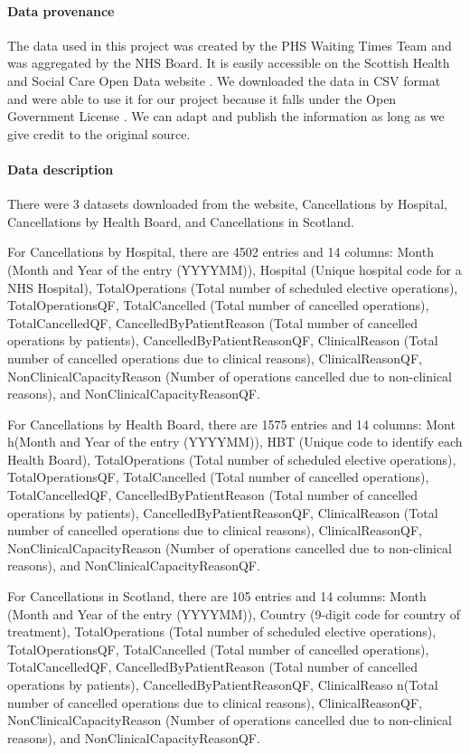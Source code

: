 \documentclass[11pt,a4paper]{article}
\begin{document}
\paragraph{Data provenance} 
The data used in this project was created by the PHS Waiting Times Team and was aggregated by the NHS Board. It is easily accessible on the Scottish Health and Social Care Open Data website \cite{public_health_scotland}. We downloaded the data in CSV format and were able to use it for our project because it falls under the Open Government License \cite{the_national_archives_2019}. We can adapt and publish the information as long as we give credit to the original source.


\paragraph{Data description} 
There were 3 datasets downloaded from the website, Cancellations by Hospital, Cancellations by Health Board, and Cancellations in Scotland. 

For Cancellations by Hospital, there are 4502 entries and 14 columns: Month (Month and Year of the entry (YYYYMM)), Hospital (Unique hospital code for a NHS Hospital), TotalOperations (Total number of scheduled elective operations), TotalOperationsQF, TotalCancelled (Total number of cancelled operations), TotalCancelledQF, CancelledByPatientReason (Total number of cancelled operations by patients), CancelledByPatientReasonQF, ClinicalReason (Total number of cancelled operations due to clinical reasons), ClinicalReasonQF, NonClinicalCapacityReason (Number of operations cancelled due to non-clinical reasons), and NonClinicalCapacityReasonQF.

For Cancellations by Health Board, there are 1575 entries and 14 columns: Mont h(Month and Year of the entry (YYYYMM)), HBT (Unique code to identify each Health Board), TotalOperations (Total number of scheduled elective operations), TotalOperationsQF, TotalCancelled (Total number of cancelled operations), TotalCancelledQF, CancelledByPatientReason (Total number of cancelled operations by patients), CancelledByPatientReasonQF, ClinicalReason (Total number of cancelled operations due to clinical reasons), ClinicalReasonQF, NonClinicalCapacityReason (Number of operations cancelled due to non-clinical reasons), and NonClinicalCapacityReasonQF.

For Cancellations in Scotland, there are 105 entries and 14 columns: Month (Month and Year of the entry (YYYYMM)), Country (9-digit code for country of treatment), TotalOperations (Total number of scheduled elective operations), TotalOperationsQF, TotalCancelled (Total number of cancelled operations), TotalCancelledQF, CancelledByPatientReason (Total number of cancelled operations by patients), CancelledByPatientReasonQF, ClinicalReaso n(Total number of cancelled operations due to clinical reasons), ClinicalReasonQF, NonClinicalCapacityReason (Number of operations cancelled due to non-clinical reasons), and NonClinicalCapacityReasonQF.
\end{document}
